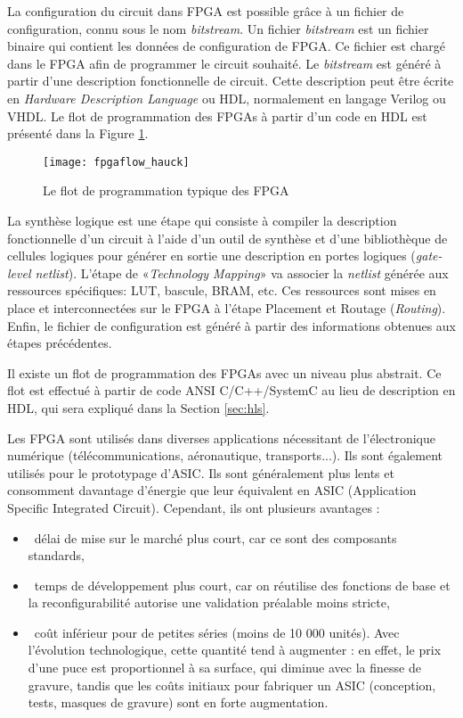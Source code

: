 La configuration du circuit dans FPGA est possible grâce à un fichier de configuration, connu sous le nom
\emph{bitstream}. Un fichier \emph{bitstream} est un fichier binaire qui contient les données de configuration
de FPGA. Ce fichier est chargé dans le FPGA afin de programmer le circuit souhaité.
Le \emph{bitstream} est généré à partir d'une description fonctionnelle de circuit.
Cette description peut être écrite en \emph{Hardware Description Language} ou HDL, normalement
en langage Verilog ou VHDL. Le flot de programmation des FPGAs à partir d'un code en HDL est présenté dans la Figure \ref{fig:fpgaflow}. 

\begin{figure}[h]
	\centering
	\texttt{[image: fpgaflow\_hauck]}
	\caption{Le flot de programmation typique des FPGA}
	\label{fig:fpgaflow}
	\vspace{-2mm}
\end{figure}

La synthèse logique est une étape qui consiste à compiler la description fonctionnelle d'un circuit à l'aide d'un outil de synthèse et
d'une bibliothèque de cellules logiques pour générer en sortie une description en portes logiques (\emph{gate-level netlist}).
L'étape de «\emph{Technology Mapping}» va associer la \emph{netlist} générée aux ressources spécifiques: LUT, bascule, BRAM, etc.
Ces ressources sont mises en place et interconnectées sur le FPGA à l'étape Placement et Routage (\emph{Routing}).
Enfin, le fichier de configuration est généré à partir des informations obtenues aux étapes précédentes.

Il existe un flot de programmation des FPGAs avec un niveau plus abstrait. Ce flot est effectué à partir de code ANSI C/C++/SystemC
au lieu de description en HDL, qui sera expliqué dans la Section \ref{sec:hls}.

Les FPGA sont utilisés dans diverses applications nécessitant de l'électronique numérique (télécommunications, aéronautique, transports...).
Ils sont également utilisés pour le prototypage d'ASIC.
Ils sont généralement plus lents et consomment davantage d'énergie 
que leur équivalent en ASIC (Application Specific Integrated Circuit). Cependant, ils ont plusieurs avantages :
\begin{itemize}
    \item\ délai de mise sur le marché plus court, car ce sont des composants standards,
    \item\ temps de développement plus court, car on réutilise des fonctions de base et 
	    la reconfigurabilité autorise une validation préalable moins stricte,
    \item\ coût inférieur pour de petites séries (moins de 10 000 unités). 
	Avec l'évolution technologique, cette quantité tend à augmenter : en effet, le prix d'une puce est 
	proportionnel à sa surface, qui diminue avec la finesse de gravure, tandis que les coûts initiaux 
	pour fabriquer un ASIC (conception, tests, masques de gravure) sont en forte augmentation.
\end{itemize}

